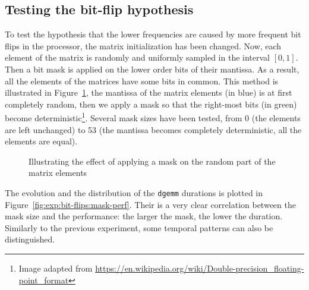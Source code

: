         \subsection{Testing the bit-flip hypothesis}
            To test the hypothesis that the lower frequencies are caused by more frequent bit flips in the processor,
            the matrix initialization has been changed. Now, each element of the matrix is randomly and uniformly
            sampled in the interval \([0,1]\). Then a bit mask is applied on the lower order bits of their mantissa. As
            a result, all the elements of the matrices have some bits in common. This method is illustrated in
            Figure~\ref{fig:exp:bit-flips:mask_illustration}, the mantissa of the matrix elements (in blue) is at first
            completely random, then we apply a mask so that the right-most bits (in green) become
            deterministic\footnote{Image adapted from
            \url{https://en.wikipedia.org/wiki/Double-precision_floating-point_format}}.  Several mask sizes have been
            tested, from 0 (the elements are left unchanged) to 53 (the mantissa becomes completely deterministic, all
            the elements are equal).
            \begin{figure}[htpb]
                \begin{center}
                    
                    \vspace{-0.2cm}


                    \vspace{-0.2cm}
                    
                \end{center}
                \caption{Illustrating the effect of applying a mask on the random part of the matrix
                elements\label{fig:exp:bit-flips:mask_illustration}}
            \end{figure}

            The evolution and the distribution of the \texttt{dgemm} durations is plotted in
            Figure~\ref{fig:exp:bit-flips:mask-perf}. Their is a very clear correlation between the mask size and the
            performance: the larger the mask, the lower the duration. Similarly to the previous experiment, some
            temporal patterns can also be distinguished.

